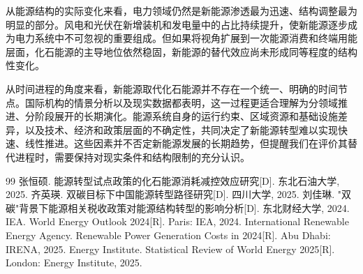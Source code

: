 \documentclass[twocolumn, a4paper, 10pt, UTF8]{ctexart}
\begin{document}
从能源结构的实际变化来看，电力领域仍然是新能源渗透最为迅速、结构调整最为明显的部分。风电和光伏在新增装机和发电量中的占比持续提升，使新能源逐步成为电力系统中不可忽视的重要组成。但如果将视角扩展到一次能源消费和终端用能层面，化石能源的主导地位依然稳固，新能源的替代效应尚未形成同等程度的结构性变化。

从时间进程的角度来看，新能源取代化石能源并不存在一个统一、明确的时间节点。国际机构的情景分析以及现实数据都表明，这一过程更适合理解为分领域推进、分阶段展开的长期演化。能源系统自身的运行约束、区域资源和基础设施差异，以及技术、经济和政策层面的不确定性，共同决定了新能源转型难以实现快速、线性推进。这些因素并不否定新能源发展的长期趋势，但提醒我们在评价其替代进程时，需要保持对现实条件和结构限制的充分认识。

\renewcommand{\refname}{\raggedright \large \heiti 参考文献：}
\begin{thebibliography}{99}
    \setlength{\itemsep}{0pt} \small
     张恒硕. 能源转型试点政策的化石能源消耗减控效应研究[D]. 东北石油大学, 2025.
     齐英瑛. 双碳目标下中国能源转型路径研究[D]. 四川大学, 2025.
     刘佳琳. "双碳"背景下能源相关税收政策对能源结构转型的影响分析[D]. 东北财经大学, 2024.
     IEA. World Energy Outlook 2024[R]. Paris: IEA, 2024.
     International Renewable Energy Agency. Renewable Power Generation Costs in 2024[R]. Abu Dhabi: IRENA, 2025.
     Energy Institute. Statistical Review of World Energy 2025[R]. London: Energy Institute, 2025.
\end{thebibliography}
\end{document}
